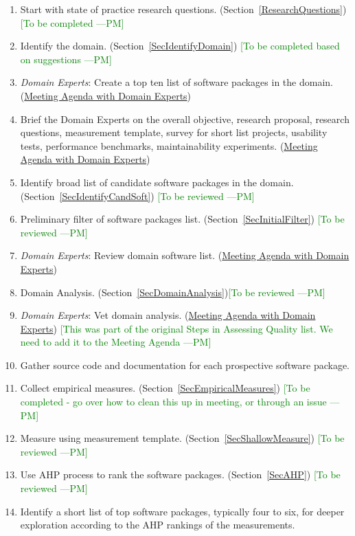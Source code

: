 \documentclass[letterpaper,cleveref]{lipics-v2019}
\newcommand{\authornote}[3]{\textcolor{#1}{[#3 ---#2]}}
\newcommand{\authornote}[3]{}
\newcommand{\pmi}[1]{\authornote{green}{PM}{#1}} %
\theoremstyle{definition}
\begin{document}
\begin{enumerate}
\item Start with state of practice research questions. (Section~\ref{ResearchQuestions}) \pmi{To be completed}
\item Identify the domain. (Section~\ref{SecIdentifyDomain}) \pmi{To be completed based on suggestions}
\item \emph{Domain Experts}: Create a top ten list of software packages in the domain. (\href{run:Meeting Agenda with Domain Experts.pdf}{Meeting Agenda with Domain Experts})
\item Brief the Domain Experts on the overall objective, research proposal, research questions, measurement template, survey for short list projects, usability tests, performance benchmarks, maintainability experiments. (\href{run:Meeting Agenda with Domain Experts.pdf}{Meeting Agenda with Domain Experts})
\item Identify broad list of candidate software packages in the domain. (Section~\ref{SecIdentifyCandSoft}) \pmi{To be reviewed}
\item Preliminary filter of software packages list. (Section~\ref{SecInitialFilter}) \pmi{To be reviewed}
\item \emph{Domain Experts}: Review domain software list. (\href{run:Meeting Agenda with Domain Experts.pdf}{Meeting Agenda with Domain Experts})
\item Domain Analysis. (Section~\ref{SecDomainAnalysis})\pmi{To be reviewed}
\item \emph{Domain Experts}: Vet domain analysis. (\href{run:Meeting Agenda with Domain Experts.pdf}{Meeting Agenda with Domain Experts}) \pmi{This was part of the original Steps in Assessing Quality list. We need to add it to the Meeting Agenda}
\item Gather source code and documentation for each prospective software package.
\item Collect empirical measures. (Section~\ref{SecEmpiricalMeasures}) \pmi{To be completed - go over how to clean this up in meeting, or through an issue}
\item Measure using measurement template. (Section~\ref{SecShallowMeasure}) \pmi{To be reviewed}
\item Use AHP process to rank the software packages. (Section~\ref{SecAHP}) \pmi{To be reviewed}
\item Identify a short list of top software packages, typically four to six, for deeper exploration according to the AHP rankings of the measurements.

\end{enumerate}
\end{document}
